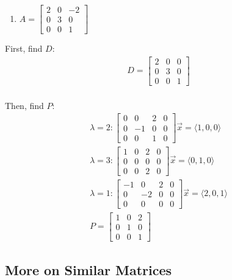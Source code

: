 \documentclass[
  letterpaper,
  DIV=11,
  numbers=noendperiod]{scrartcl}
\providecommand{\tightlist}{%
  \setlength{\itemsep}{0pt}\setlength{\parskip}{0pt}}\usepackage{longtable,booktabs,array}
\begin{document}
\begin{enumerate}
\def\labelenumi{\arabic{enumi}.}
\setcounter{enumi}{1}
\tightlist
\item
  \(A = \begin{bmatrix}2 & 0 & -2 \\ 0 & 3 & 0 \\ 0 & 0 & 1\end{bmatrix}\)
\end{enumerate}

First, find \(D\): \begin{align*}
D = \begin{bmatrix} 2 & 0 & 0 \\ 0 & 3 & 0 \\ 0 & 0 & 1\end{bmatrix} \\
\end{align*}

Then, find \(P\): \begin{align*}
\lambda = 2: \left[\begin{array}{ccc|c}0 & 0 & 2 & 0 \\ 0 & -1 & 0 & 0 \\ 0 & 0 & 1 & 0\end{array}\right] \vec{x} = \langle1, 0, 0\rangle \\
\lambda = 3: \left[\begin{array}{ccc|c}1 & 0 & 2 & 0 \\ 0 & 0 & 0 & 0 \\ 0 & 0 & 2 & 0\end{array}\right] \vec{x} = \langle0, 1, 0\rangle \\
\lambda = 1: \left[\begin{array}{ccc|c}-1 & 0 & 2 & 0 \\ 0 & -2 & 0 & 0 \\ 0 & 0 & 0 & 0\end{array}\right] \vec{x} = \langle2, 0, 1\rangle \\
P = \begin{bmatrix}1 & 0 & 2 \\ 0 & 1 & 0 \\ 0 & 0 & 1\end{bmatrix}
\end{align*}

\subsection{More on Similar Matrices}\label{more-on-similar-matrices}
\end{document}
